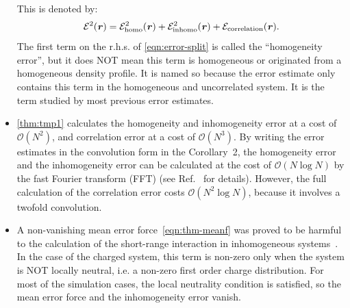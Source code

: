 \documentclass[journal=jacsat,manuscript=article]{achemso}
\newcommand{\redc}[1]{{\color{black} #1}}
\renewcommand{\v}[1]{\textbf{\textit{#1}}}
\begin{document}
\begin{itemize}
  This is denoted by:
  \begin{align}\label{eqn:error-split}
    \mathcal E^2(\v r)
    =
    \mathcal E^2_{\textrm{homo}}(\v r) +
    \mathcal E^2_{\textrm{inhomo}}(\v r) +
    \mathcal E_{\textrm{correlation}}(\v r).
  \end{align}
  The first term on the r.h.s. of \ref{eqn:error-split} is called
  the ``homogeneity error'', but it does NOT mean this term is
  homogeneous or originated from a homogeneous density profile.  It is
  named so because the error estimate only contains this term in the
  homogeneous and uncorrelated system. It is the term studied by most
  previous error estimates.
\item
  \ref{thm:tmp1} calculates the homogeneity and inhomogeneity
  error at a cost of $\mathcal O(N^2)$, and correlation error
  at a cost of $\mathcal O(N^3)$.
  By writing the error estimates in the convolution form in
  the
  Corollary~2,
  the homogeneity error and the inhomogeneity
  error can be calculated at the cost of $\mathcal O(N\log N)$ by the
  fast Fourier transform (FFT) (see Ref.~\cite{wang2012} for details).
  However, the full calculation of the correlation error costs $\mathcal
  O(N^2\log N)$, because it involves a twofold convolution.
\item A non-vanishing mean error force~\ref{eqn:thm-meanf} was proved
  to be
  harmful to the calculation of the short-range interaction
  in inhomogeneous systems~\cite{wang2012}.
  In the case of the charged system, this
  term is non-zero only when the system is NOT locally neutral,
  i.e. a non-zero first order charge distribution. For
  most of the simulation cases, the \redc{local neutrality} condition is
  satisfied, so the mean error force and the inhomogeneity error
  vanish.
\end{itemize}
\end{document}
